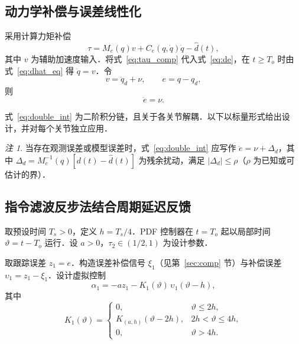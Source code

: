 \documentclass[12pt,a4paper]{article}
\theoremstyle{definition}
\theoremstyle{remark}
\newtheorem{remark}{注}[section]
\newcommand{\vi}{\upsilon}
\newcommand{\vth}{\vartheta}
\begin{document}
\subsection{动力学补偿与误差线性化}

采用计算力矩补偿
\begin{equation}\label{eq:tau_comp}
  \tau=M_e(q)v+C_e(q,\dot q)\dot q-\hat d(t),
\end{equation}
其中 $v$ 为辅助加速度输入．将式~\eqref{eq:tau_comp} 代入式~\eqref{eq:de}，在 $t\ge T_o$ 时由式~\eqref{eq:dhat_eq} 得 $\ddot q=v$．令
\begin{equation}
  v=\ddot q_d+\nu,\qquad e=q-q_d,
\end{equation}
则
\begin{equation}\label{eq:double_int}
  \ddot e=\nu .
\end{equation}

式~\eqref{eq:double_int} 为二阶积分链，且关于各关节解耦．以下以标量形式给出设计，并对每个关节独立应用．

\begin{remark}
当存在观测误差或模型误差时，式~\eqref{eq:double_int} 应写作 $\ddot e=\nu+\Delta_d$，其中 $\Delta_d=M_e^{-1}(q)[d(t)-\hat d(t)]$ 为残余扰动，满足 $|\Delta_d|\le\rho$（$\rho$ 为已知或可估计的界）．
\end{remark}

\subsection{指令滤波反步法结合周期延迟反馈}

取预设时间 $T_s>0$，定义 $h=T_s/4$．PDF 控制器在 $t=T_o$ 起以局部时间 $\vth=t-T_o$ 运行．设 $a>0$，$\tau_2\in(1/2,1)$ 为设计参数．


取跟踪误差 $z_1=e$．构造误差补偿信号 $\xi_1$（见第~\ref{sec:comp} 节）与补偿误差 $\vi_1=z_1-\xi_1$．设计虚拟控制
\begin{equation}\label{eq:alpha1}
  \alpha_1=-a z_1-K_1(\vth)\,\vi_1(\vth-h),
\end{equation}
其中
\begin{equation}\label{eq:K1}
  K_1(\vth)=
  \begin{cases}
    0, & \vth\le 2h,\\[2pt]
    K_{(a,h)}(\vth-2h), & 2h<\vth\le 4h,\\[2pt]
    0, & \vth>4h .
  \end{cases}
\end{equation}
\end{document}
